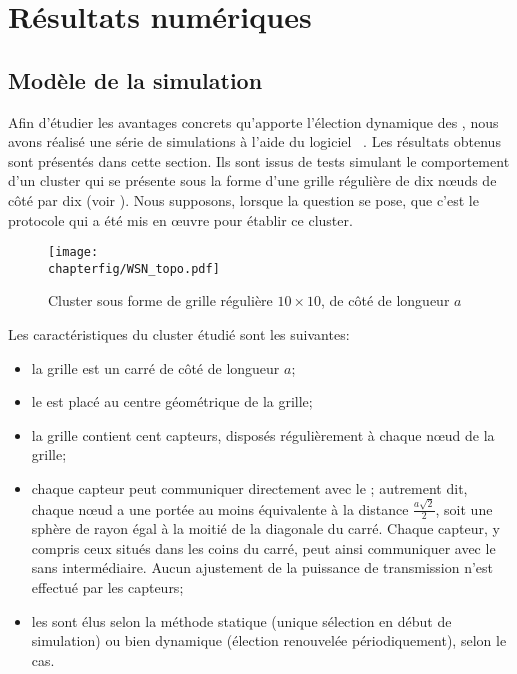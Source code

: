 \section{Résultats numériques}
\label{sa:sec:resultats}
    \subsection{Modèle de la simulation}

Afin d'étudier les avantages concrets qu'apporte l'élection dynamique des \cns, nous avons réalisé une série de simulations à l'aide du logiciel \nsii~\cite{ns2}.
Les résultats obtenus sont présentés dans cette section.
Ils sont issus de tests simulant le comportement d'un cluster qui se présente sous la forme d'une grille régulière de dix nœuds de côté par dix (voir ).
Nous supposons, lorsque la question se pose, que c'est le protocole \leach qui a été mis en œuvre pour établir ce cluster.
\begin{figure}[!b]
    \centering
    \texttt{[image: \\chapterfig/WSN\_topo.pdf]}
    \caption{Cluster sous forme de grille régulière $10 \times 10$, de côté de longueur $a$}\label{sa:fig:grille}
\end{figure}

Les caractéristiques du cluster étudié sont les suivantes:
\begin{itemize}
    \item la grille est un carré de côté de longueur $a$;
    \item le \ch est placé au centre géométrique de la grille;
    \item la grille contient cent capteurs, disposés régulièrement à chaque nœud de la grille;
    \item chaque capteur peut communiquer directement avec le \ch; autrement dit, chaque nœud a une portée au moins équivalente à la distance $\frac{a \sqrt{2}}{2}$, soit une sphère de rayon égal à la moitié de la diagonale du carré. Chaque capteur, y compris ceux situés dans les coins du carré, peut ainsi communiquer avec le \ch sans intermédiaire. Aucun ajustement de la puissance de transmission n'est effectué par les capteurs;
    \item les \cns sont élus selon la méthode statique (unique sélection en début de simulation) ou bien dynamique (élection renouvelée périodiquement), selon le cas.
\end{itemize}


